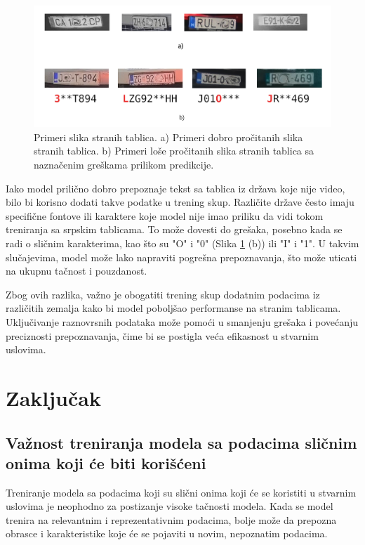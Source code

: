 \documentclass[a4paper,12pt]{article}
\begin{document}
	\begin{figure}[H]
		\centering
		\includegraphics[width=\textwidth]{assets/good-and-bad-predictions.png}
		\caption{Primeri slika stranih tablica. a) Primeri dobro pročitanih slika stranih tablica. b) Primeri loše pročitanih slika stranih tablica sa naznačenim greškama prilikom predikcije.}
		\label{fig:good-and-bad-predictions}
	\end{figure}
	
	Iako model prilično dobro prepoznaje tekst sa tablica iz država koje nije video, bilo bi korisno dodati takve podatke u trening skup. Različite države često imaju specifične fontove ili karaktere koje model nije imao priliku da vidi tokom treniranja sa srpskim tablicama. To može dovesti do grešaka, posebno kada se radi o sličnim karakterima, kao što su "O" i "0" (Slika \ref{fig:good-and-bad-predictions} (b)) ili "I" i "1". U takvim slučajevima, model može lako napraviti pogrešna prepoznavanja, što može uticati na ukupnu tačnost i pouzdanost.
	
	Zbog ovih razlika, važno je obogatiti trening skup dodatnim podacima iz različitih zemalja kako bi model poboljšao performanse na stranim tablicama. Uključivanje raznovrsnih podataka može pomoći u smanjenju grešaka i povećanju preciznosti prepoznavanja, čime bi se postigla veća efikasnost u stvarnim uslovima.
	\newpage
	
	\section{Zaključak}
	
	\subsection{Važnost treniranja modela sa podacima sličnim onima koji će biti korišćeni}
	Treniranje modela sa podacima koji su slični onima koji će se koristiti u stvarnim uslovima je neophodno za postizanje visoke tačnosti modela. Kada se model \todo[color=green!40]{Da li je lepše koristiti termin ]obučava}trenira na relevantnim i reprezentativnim podacima, bolje može da prepozna obrasce i karakteristike koje će se pojaviti u novim, nepoznatim podacima.
	
\end{document}

